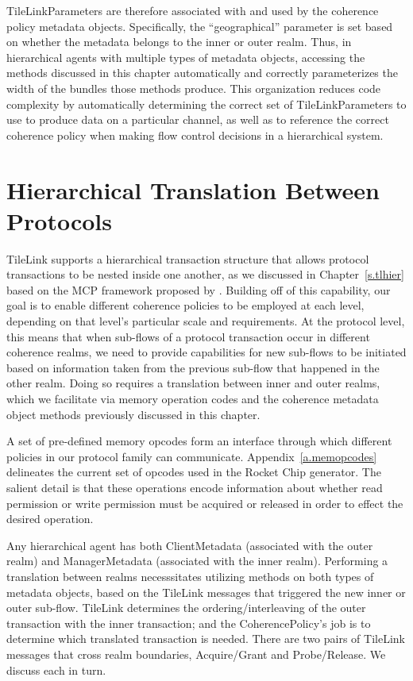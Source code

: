 TileLinkParameters are therefore associated with and used by the coherence policy metadata objects.
Specifically, the ``geographical'' parameter  is set based on whether the metadata belongs to the inner or outer realm.
Thus, in hierarchical agents with multiple types of metadata objects, accessing the methods
discussed in this chapter automatically and correctly parameterizes the width of the bundles those methods produce.
This organization reduces code complexity by automatically determining the correct set of TileLinkParameters to use to produce data on a particular channel,
as well as to reference the correct coherence policy when making flow control decisions in a hierarchical system.

\section{Hierarchical Translation Between Protocols}

TileLink supports a hierarchical transaction structure that allows protocol transactions
to be nested inside one another, as we discussed in Chapter~\ref{s.tlhier}
based on the MCP framework proposed by \cite{beu2011manager}.
Building off of this capability, our goal is to enable different coherence policies to be employed at each level,
depending on that level's particular scale and requirements.
At the protocol level, this means that when sub-flows of a protocol transaction
occur in different coherence realms, we need to provide capabilities for
new sub-flows to be initiated based on information taken from the previous sub-flow
that happened in the other realm.
Doing so requires a translation between inner and outer realms,
which we facilitate via memory operation codes and the
coherence metadata object methods previously discussed in this chapter.

A set of pre-defined memory opcodes
form an interface through which different policies in our protocol family can communicate.
Appendix~\ref{a.memopcodes} delineates the current set of opcodes used in the Rocket Chip generator.
The salient detail is that these operations encode information about whether read permission or write permission
must be acquired or released in order to effect the desired operation.

Any hierarchical agent has both ClientMetadata (associated with the outer realm)
and ManagerMetadata (associated with the inner realm).
Performing a translation between realms necesssitates utilizing methods on both types of metadata objects,
based on the TileLink messages that triggered the new inner or outer sub-flow.
TileLink determines the ordering/interleaving of the outer transaction with the inner transaction;
and the CoherencePolicy's job is to determine which translated transaction is needed.
There are two pairs of TileLink messages that cross realm boundaries,
Acquire/Grant and Probe/Release.
We discuss each in turn.

